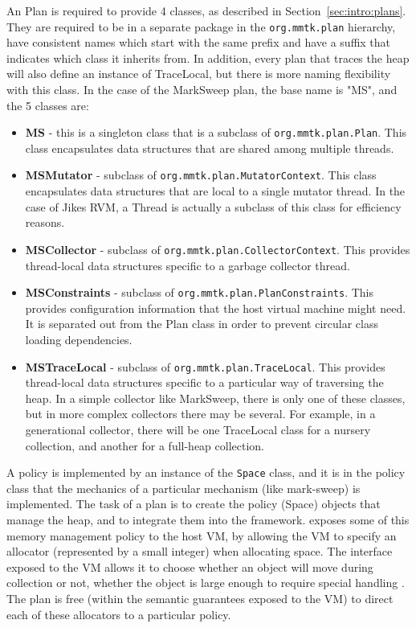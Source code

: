 An \mmtk Plan is required to provide 4 classes, as described in
Section~\ref{sec:intro:plans}.
They are required to be in a separate package in the \lstinline|org.mmtk.plan|
hierarchy, have consistent names which start with the same prefix and have a
suffix that indicates which class it inherits from.
In addition, every plan that traces the heap will also define an instance of
TraceLocal, but there is more naming flexibility with this class.
In the case of the MarkSweep plan, the base name is "MS", and the 5 classes
are:
\begin{itemize}
\item \textbf{MS} - this is a singleton class that is a subclass of
\lstinline|org.mmtk.plan.Plan|.
This class encapsulates data structures that are shared among multiple threads.
\item \textbf{MSMutator} - subclass of \lstinline|org.mmtk.plan.MutatorContext|. 
This class encapsulates data structures that are local to a single mutator thread.  
In the case of Jikes RVM, a Thread is actually a subclass of this class for efficiency reasons.
\item \textbf{MSCollector} - subclass of
\lstinline|org.mmtk.plan.CollectorContext|.
This provides thread-local data structures specific to a garbage collector thread.
\item \textbf{MSConstraints} - subclass of
\lstinline|org.mmtk.plan.PlanConstraints|.
This provides configuration information that the host virtual machine might need.  
It is separated out from the Plan class in order to prevent circular class loading dependencies.
\item \textbf{MSTraceLocal} - subclass of \lstinline|org.mmtk.plan.TraceLocal|. 
This provides thread-local data structures specific to a particular way of traversing the heap.  
In a simple collector like MarkSweep, there is only one of these classes, 
but in more complex collectors there may be several.  For example, in a generational collector, 
there will be one TraceLocal class for a nursery collection, and another for a full-heap collection.
\end{itemize}

A policy is implemented
by an instance of the \lstinline|Space| class, and it is in the policy class
that the mechanics of a particular mechanism (like mark-sweep) is implemented.  
The task of a plan is to create the policy (Space) objects that manage the heap, 
and to integrate them into the \mmtk framework.  
\mmtk exposes some of this memory management policy to the host VM, 
by allowing the VM to specify an allocator 
(represented by a small integer) when allocating space.  
The interface exposed to the VM allows it to choose whether an object 
will move during collection or not, whether the object is 
large enough to require special handling \etc.  
The \mmtk plan is free (within the semantic guarantees exposed to the VM) 
to direct each of these allocators to a particular policy.

